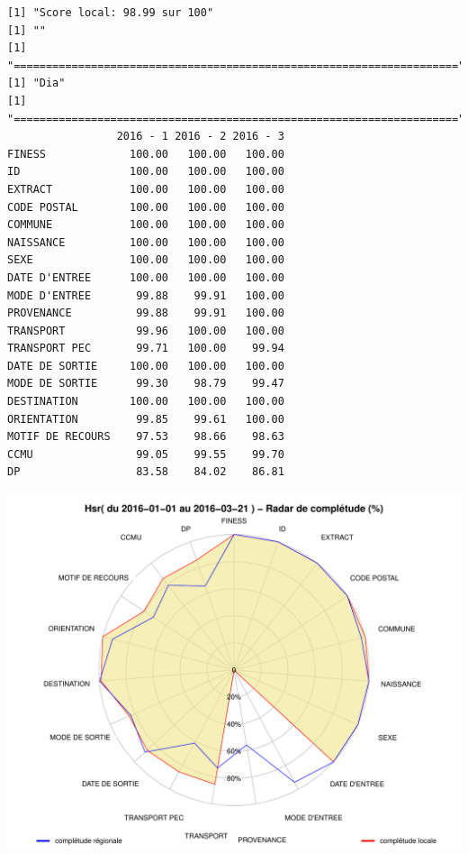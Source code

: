 \documentclass[]{article}
\begin{document}
\begin{verbatim}
[1] "Score local: 98.99 sur 100"
[1] ""
[1] "====================================================================="
[1] "Dia"
[1] "====================================================================="
                 2016 - 1 2016 - 2 2016 - 3
FINESS             100.00   100.00   100.00
ID                 100.00   100.00   100.00
EXTRACT            100.00   100.00   100.00
CODE POSTAL        100.00   100.00   100.00
COMMUNE            100.00   100.00   100.00
NAISSANCE          100.00   100.00   100.00
SEXE               100.00   100.00   100.00
DATE D'ENTREE      100.00   100.00   100.00
MODE D'ENTREE       99.88    99.91   100.00
PROVENANCE          99.88    99.91   100.00
TRANSPORT           99.96   100.00   100.00
TRANSPORT PEC       99.71   100.00    99.94
DATE DE SORTIE     100.00   100.00   100.00
MODE DE SORTIE      99.30    98.79    99.47
DESTINATION        100.00   100.00   100.00
ORIENTATION         99.85    99.61   100.00
MOTIF DE RECOURS    97.53    98.66    98.63
CCMU                99.05    99.55    99.70
DP                  83.58    84.02    86.81
\end{verbatim}

\includegraphics{completude_files/figure-latex/finess-13.pdf}
\end{document}

